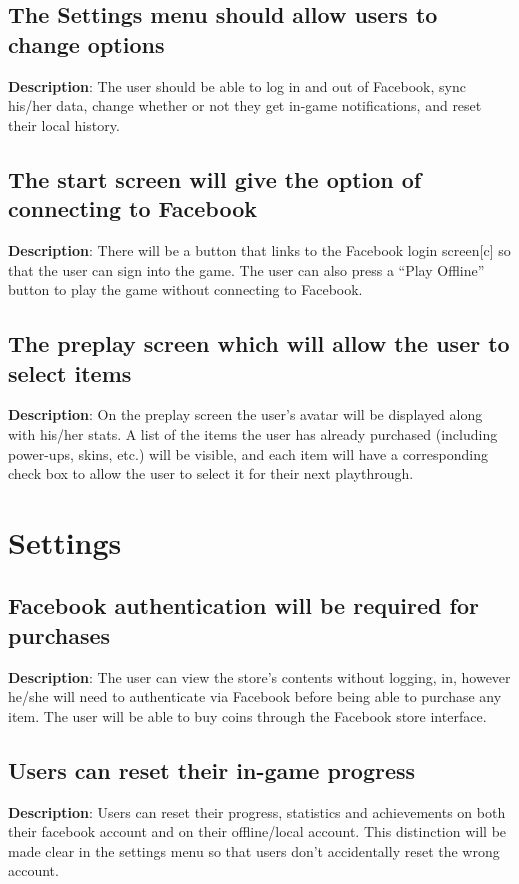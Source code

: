 \subsection{The Settings menu should allow users to change options}
\textbf{Description}: The user should be able to log in and out of
Facebook, sync his/her data, change whether or not they get in-game
notifications, and reset their local history.

\subsection{The start screen will give the option of connecting to Facebook}
\textbf{Description}: There will be a button that links to the Facebook
login screen{[}c{]} so that the user can sign into the game. The user
can also press a \textquotedblleft{}Play Offline\textquotedblright{}
button to play the game without connecting to Facebook.

\subsection{The preplay screen which will allow the user to select items}
\textbf{Description}: On the preplay screen the user\textquoteright{}s
avatar will be displayed along with his/her stats. A list of the items
the user has already purchased (including power-ups, skins, etc.)
will be visible, and each item will have a corresponding check box
to allow the user to select it for their next playthrough.

\section{Settings}
\renewcommand\thesubsection{SET-%
\ifnum\value{subsection}<10 0\fi
\arabic{subsection}}
\subsection{Facebook authentication will be required for purchases}
\textbf{Description}: The user can view the store\textquoteright{}s
contents without logging, in, however he/she will need to authenticate
via Facebook before being able to purchase any item. The user will
be able to buy coins through the Facebook store interface.

\subsection{Users can reset their in-game progress}
\textbf{Description}: Users can reset their progress, statistics and
achievements on both their facebook account and on their offline/local
account. This distinction will be made clear in the settings menu
so that users don\textquoteright{}t accidentally reset the wrong account.

